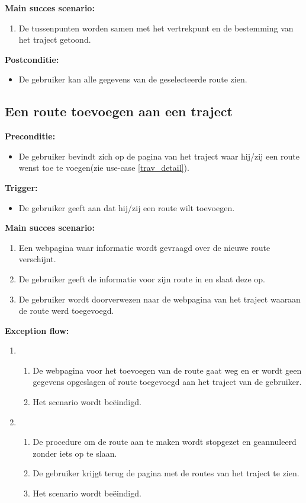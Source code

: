 \documentclass[11pt,twoside,a4paper]{article}
\newcommand{\subpunt}[1]{
	\noindent
	\textbf{\small{#1}}
}
\newenvironment{precond}{
	\subpunt{Preconditie:}
	\begin{itemize}[label={}]
}{
	\end{itemize}
}
\newenvironment{trigger}{
	\subpunt{Trigger:}
	\begin{itemize}[label={}]
}{
	\end{itemize}
}
\newenvironment{mainss}{
	\subpunt{Main succes scenario:}
	\begin{enumerate}
}{
	\end{enumerate}
}
\newenvironment{except}{
	\subpunt{Exception flow:}
	\begin{enumerate}
}{
	\end{enumerate}
}
\newenvironment{postcond}{
	\subpunt{Postconditie:}
	\begin{itemize}[label={}]
}{
	\end{itemize}
}
\newcommand{\flowidx}{0}
\newcounter{nstap}
\newcommand{\flowtitle}[1]{					%
	\setcounter{nstap}{0}
	\item[\flowidx.][\emph{#1}]
}
\newcommand{\flowstap}{ 					%
	\stepcounter{nstap}
	\item[\flowidx.\arabic{nstap}]
}
\newenvironment{flow}[2]{					
	\renewcommand{\flowidx}{#1}
	
	\flowtitle{#2}
	\begin{enumerate}
}{
	\end{enumerate}
}
\begin{document}
	\begin{mainss}
		\item De tussenpunten worden samen met het vertrekpunt en de bestemming van het traject getoond.
	\end{mainss}
	
	\begin{postcond}
		\item De gebruiker kan alle gegevens van de geselecteerde route zien.
	\end{postcond}
	
	
	\subsection{Een route toevoegen aan een traject}
	
	\begin{precond}
		\item De gebruiker bevindt zich op de pagina van het traject waar hij/zij een route wenst toe te voegen(zie use-case \ref{trav_detail}).
	\end{precond}
	
	\begin{trigger}
		\item De gebruiker geeft aan dat hij/zij een route wilt toevoegen.
	\end{trigger}
	
	\begin{mainss}
		\item Een webpagina waar informatie wordt gevraagd over de nieuwe route verschijnt.
		\item De gebruiker geeft de informatie voor zijn route in en slaat deze op.\label{newrout_inv}
		\item De gebruiker wordt doorverwezen naar de webpagina van het traject waaraan de route werd toegevoegd.\label{newrout_end}
	\end{mainss}	
	
	\begin{except}
		\begin{flow}{\ref{newrout_inv}-\ref{newrout_end}}{De gebruiker verlaat de webpagina en/of gaat naar een andere webpagina.}
			\flowstap De webpagina voor het toevoegen van de route gaat weg en er wordt geen gegevens opgeslagen of route toegevoegd aan het traject van de gebruiker.
			\flowstap Het scenario wordt be\"eindigd.
		\end{flow}
		
		\begin{flow}{\ref{newrout_end}}{De gebruiker annuleert de operatie.}
			\flowstap De procedure om de route aan te maken wordt stopgezet en geannuleerd zonder iets op te slaan.
			\flowstap De gebruiker krijgt terug de pagina met de routes van het traject te zien.
			\flowstap Het scenario wordt be\"eindigd.
		\end{flow}
		
	\end{except}
	
\end{document}
